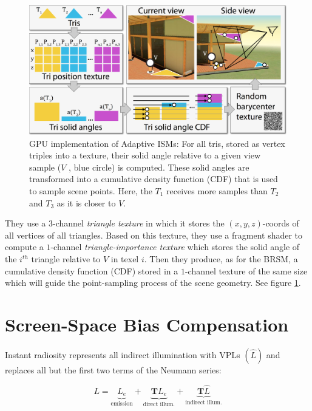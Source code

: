 \begin{figure}\label{f:adaptive-ISMs-4}
	\begin{center}
		\includegraphics[width=1.\textwidth]{graphics/ir/ir-5-4}
	\end{center}
	\caption{GPU implementation of Adaptive ISMs: For all tris, stored as vertex triples into a texture, their solid angle relative to a given view sample ($V$ , blue circle) is computed. These solid angles are transformed into a cumulative density function (CDF) that is used to sample scene points. Here, the $T_1$ receives more samples than $T_2$ and $T_3$ as it is closer to $V$.}
\end{figure}

They use a $3$-channel \textit{triangle texture} in which it stores the $(x,y,z)$-coords of all vertices of all triangles. Based on this texture, they use a fragment shader to compute a $1$-channel \textit{triangle-importance texture} which stores the solid angle of the $i^{th}$ triangle relative to $V$ in texel $i$. Then they produce, as for the BRSM, a cumulative density function (CDF) stored in a $1$-channel texture of the same size which will guide the point-sampling process of the scene geometry. See figure \ref{f:adaptive-ISMs-4}.




\section{Screen-Space Bias Compensation}
Instant radiosity represents all indirect illumination with VPLs $(\hat{L})$ and replaces all but the first two terms of the Neumann series:

\begin{equation}\label{e:ssbc-1}
	L=\underbrace{L_e}_{\text{emission}}+\underbrace{\mathbf{T}L_e}_{\text{direct illum.}}+\underbrace{\mathbf{T}\hat{L}}_{\text{indirect illum.}}
\end{equation}

